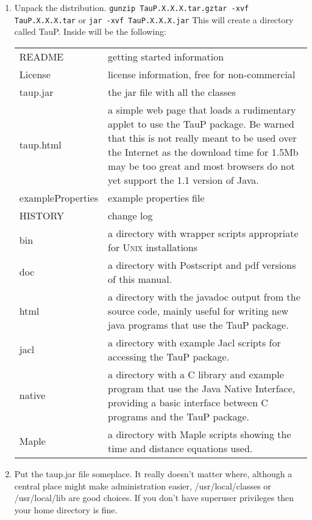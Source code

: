 \begin{enumerate}
\item Unpack the distribution.
\texttt{\newline gunzip TauP.X.X.X.tar.gz\newline tar -xvf TauP.X.X.X.tar\newline}
or
\texttt{\newline jar -xvf TauP.X.X.X.jar\newline}
This will create a directory called TauP. Inside
will be the following:
\begin{center}
\begin{tabular}{lp{4in}}
README & getting started information \\
License & license information, free for non-commercial \\
taup.jar & the jar file with all the classes \\
taup.html & a simple web page that loads a rudimentary applet to use the TauP
package. Be warned that this is not really meant to be used over the Internet
as the download time for 1.5Mb may be too great and most browsers do not yet
support the 1.1 version of Java. \\
exampleProperties & example properties file \\
HISTORY & change log \\
bin & a directory with wrapper scripts appropriate for 
\textsc{Unix} installations\\
doc & a directory with Postscript and pdf versions of this manual. \\
html & a directory with the javadoc output from
the source code, mainly useful
for writing new java programs that use the TauP package. \\
jacl & a directory with example Jacl scripts for accessing the TauP package. \\
native & a directory with a C library and example program that use the
Java Native Interface, providing a basic interface between C programs
and the TauP package. \\
Maple & a directory with Maple scripts showing the time and distance equations
used.
\end{tabular}
\end{center}

\item Put the taup.jar file someplace. It really doesn't matter where, although
a central place might make administration easier, /usr/local/classes or 
/usr/local/lib are good choices. If you don't have superuser privileges
then your home directory is fine. 


\end{enumerate}
